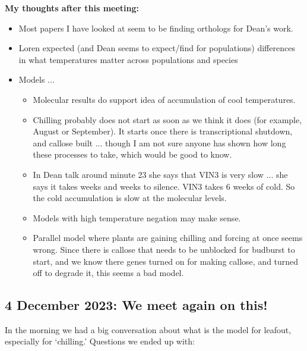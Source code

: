 \documentclass[11pt,letter]{article}
\begin{document}
{\bf My thoughts after this meeting:}
\begin{itemize}
\item Most papers I have looked at seem to be finding orthologs for Dean's work. 
\item Loren expected (and Dean seems to expect/find for populations) differences in what temperatures matter across populations and species
\item Models ... 
\begin{itemize}
\item Molecular results do support idea of accumulation of cool temperatures. 
\item Chilling probably does not start as soon as we think it does (for example, August or September). It starts once there is transcriptional shutdown, and callose built ... though I am not sure anyone has shown how long these processes to take, which would be good to know. 
\item In Dean talk around minute 23 she says that VIN3 is very slow ... she says it takes weeks and weeks to silence. VIN3 takes 6 weeks of cold. So the cold accumulation is slow at the molecular levels. 
\item Models with high temperature negation may make sense. 
\item Parallel model where plants are gaining chilling and forcing at once seems wrong. Since there is callose that needs to be unblocked for budburst to start, and we know there genes turned on for making callose, and turned off to degrade it, this seems a bad model.
\end{itemize}
\end{itemize}


\subsection{4 December 2023: We meet again on this!}

In the morning we had a big conversation about what is the model for leafout, especially for `chilling.'  Questions we ended up with:
\end{document}
